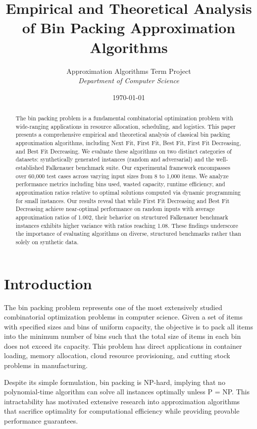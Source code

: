 \documentclass[11pt,a4paper]{article}
\title{\textbf{Empirical and Theoretical Analysis of Bin Packing Approximation Algorithms}}
\author{
    Approximation Algorithms Term Project\\
    \textit{Department of Computer Science}
}
\date{\today}
\begin{document}
\maketitle

\begin{abstract}
The bin packing problem is a fundamental combinatorial optimization problem with wide-ranging applications in resource allocation, scheduling, and logistics. This paper presents a comprehensive empirical and theoretical analysis of classical bin packing approximation algorithms, including Next Fit, First Fit, Best Fit, First Fit Decreasing, and Best Fit Decreasing. We evaluate these algorithms on two distinct categories of datasets: synthetically generated instances (random and adversarial) and the well-established Falkenauer benchmark suite. Our experimental framework encompasses over 60,000 test cases across varying input sizes from 8 to 1,000 items. We analyze performance metrics including bins used, wasted capacity, runtime efficiency, and approximation ratios relative to optimal solutions computed via dynamic programming for small instances. Our results reveal that while First Fit Decreasing and Best Fit Decreasing achieve near-optimal performance on random inputs with average approximation ratios of 1.002, their behavior on structured Falkenauer benchmark instances exhibits higher variance with ratios reaching 1.08. These findings underscore the importance of evaluating algorithms on diverse, structured benchmarks rather than solely on synthetic data.
\end{abstract}

\section{Introduction}

The bin packing problem represents one of the most extensively studied combinatorial optimization problems in computer science. Given a set of items with specified sizes and bins of uniform capacity, the objective is to pack all items into the minimum number of bins such that the total size of items in each bin does not exceed its capacity. This problem has direct applications in container loading, memory allocation, cloud resource provisioning, and cutting stock problems in manufacturing.

Despite its simple formulation, bin packing is NP-hard, implying that no polynomial-time algorithm can solve all instances optimally unless P = NP. This intractability has motivated extensive research into approximation algorithms that sacrifice optimality for computational efficiency while providing provable performance guarantees.
\end{document}
